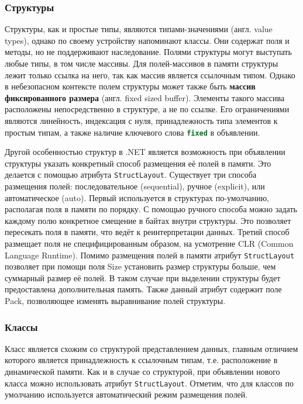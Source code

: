 \subsubsection{Структуры}
Структуры, как и простые типы, являются типами-значениями (англ. value types), однако по своему устройству напоминают классы. Они содержат поля и методы, но не поддерживают наследование. Полями структуры могут выступать любые типы, в том числе массивы. Для полей-массивов в памяти структуры лежит только ссылка на него, так как массив является ссылочным типом. Однако в небезопасном контексте полем структуры может также быть \textbf{массив фиксированного размера} (англ. fixed sized buffer). Элементы такого массива расположены непосредственно в структуре, а не по ссылке. Его ограничениями являются линейность, индексация с нуля, принадлежность типа элементов к простым типам, а также наличие ключевого слова \lstinline[language=csharp]{fixed} в объявлении.

Другой особенностью структур в .NET является возможность при объявлении структуры указать конкретный способ размещения её полей в памяти. Это делается с помощью атрибута \lstinline[language=csharp]{StructLayout}. Существует три способа размещения полей: последовательное (sequential), ручное (explicit), или автоматическое (auto). Первый используется в структурах по-умолчанию, располагая поля в памяти по порядку. С помощью ручного способа можно задать каждому полю конкретное смещение в байтах внутри структуры. Это позволяет пересекать поля в памяти, что ведёт к реинтерпретации данных. Третий способ размещает поля не специфицированным образом, на усмотрение CLR (Common Language Runtime). Помимо размещения полей в памяти атрибут \lstinline[language=csharp]{StructLayout} позволяет при помощи поля Size установить размер структуры больше, чем суммарный размер её полей. В таком случае при выделении структуры будет предоставлена дополнительная память. Также данный атрибут содержит поле Pack, позволяющее изменять выравнивание полей структуры.

\subsubsection{Классы}
Класс является схожим со структурой представлением данных, главным отличием которого является принадлежность к ссылочным типам, т.е. расположение в динамической памяти. Как и в случае со структурой, при объявлении нового класса можно использовать атрибут \lstinline[language=csharp]{StructLayout}. Отметим, что для классов по умолчанию используется автоматический режим размещения полей.

